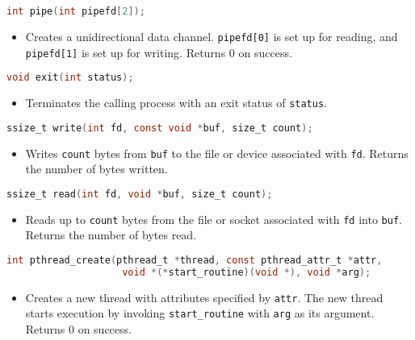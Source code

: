 \documentclass[twoside]{article}
\begin{document}
\begin{summary}
\begin{lstlisting}[language=C]
int pipe(int pipefd[2]);
\end{lstlisting}
    \begin{itemize}
        \item Creates a unidirectional data channel. \texttt{pipefd[0]} is set up for reading, and \texttt{pipefd[1]} is set up for writing. Returns 0 on success.
    \end{itemize}
    
\begin{lstlisting}[language=C]
void exit(int status);
\end{lstlisting}
    \begin{itemize}
        \item Terminates the calling process with an exit status of \texttt{status}.
    \end{itemize}
    
\begin{lstlisting}[language=C]
ssize_t write(int fd, const void *buf, size_t count);
\end{lstlisting}
    \begin{itemize}
        \item Writes \texttt{count} bytes from \texttt{buf} to the file or device associated with \texttt{fd}. Returns the number of bytes written.
    \end{itemize}
    
\begin{lstlisting}[language=C]
ssize_t read(int fd, void *buf, size_t count);
\end{lstlisting}
    \begin{itemize}
        \item Reads up to \texttt{count} bytes from the file or socket associated with \texttt{fd} into \texttt{buf}. Returns the number of bytes read.
    \end{itemize}
    
\begin{lstlisting}[language=C]
int pthread_create(pthread_t *thread, const pthread_attr_t *attr, 
                    void *(*start_routine)(void *), void *arg);
\end{lstlisting}
    \begin{itemize}
        \item Creates a new thread with attributes specified by \texttt{attr}. The new thread starts execution by invoking \texttt{start\_routine} with \texttt{arg} as its argument. Returns 0 on success.
    \end{itemize}
    

\end{summary}
\end{document}
